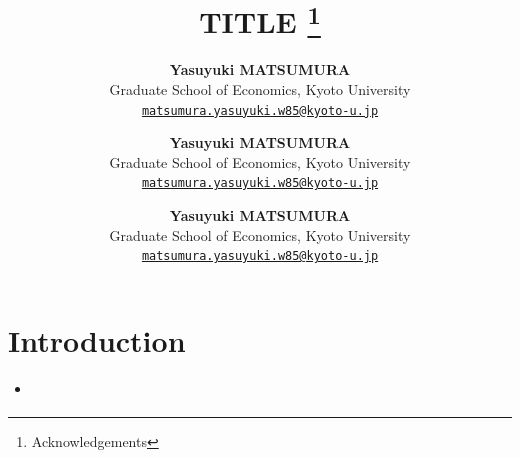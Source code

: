 \documentclass[12pt]{article}
\title{ %
  \textbf{TITLE} 
  \thanks{Acknowledgements}
}
\author{
  \textbf{Yasuyuki MATSUMURA}\\
  Graduate School of Economics, Kyoto University\\
  \href{mailto:matsumura.yasuyuki.w85@kyoto-u.jp}{\texttt{matsumura.yasuyuki.w85@kyoto-u.jp}}
\and
  \textbf{Yasuyuki MATSUMURA}\\
  Graduate School of Economics, Kyoto University\\
  \href{mailto:matsumura.yasuyuki.w85@kyoto-u.jp}{\texttt{matsumura.yasuyuki.w85@kyoto-u.jp}}
\and
  \textbf{Yasuyuki MATSUMURA}\\
  Graduate School of Economics, Kyoto University\\
  \href{mailto:matsumura.yasuyuki.w85@kyoto-u.jp}{\texttt{matsumura.yasuyuki.w85@kyoto-u.jp}}
}
\begin{document}
\maketitle

\begin{abstract}

\end{abstract}

\section{Introduction}

\begin{itemize}
  \item \cite{Matsumura-Tachibana-2025}
\end{itemize}


\newpage
{}
 

\end{document}
